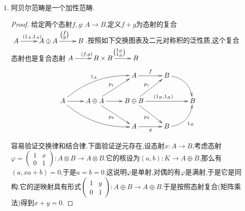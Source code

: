 \begin{enumerate}
\begin{proof}
    	这里证明后半段命题,前半段是对偶的.如果$\varphi:A\to B$是某个态射$Z\to A$的余核,那么记$\varphi$的核是$l:K\to A$,那么既然$Z\to A\to B$是0态射,按照核的定义得到了唯一的态射$Z\to K$.现在为了证明$\varphi$是$K\to A$的余核,任意给出一个$A\to C$使得$K\to A\to C$是零态射,那么复合态射$Z\to A\to C$同样是零态射,这样按照$A\to B$是$Z\to A$的余核得到唯一的$B\to C$.这就完成证明.
    	$$\xymatrix{&C&\\Z\ar[dr]_{\exists !}\ar[r]&A\ar[u]\ar[r]^{\varphi}&B\ar[ul]_{\exists !}\\&K\ar[u]^{l}&}$$
    \end{proof}
    \item 阿贝尔范畴是一个加性范畴.
    \begin{proof}
    	
    	给定两个态射$f,g:A\to B$,定义$f+g$为态射的复合$\xymatrix{A\ar[r]^{(1_A,1_A)}&A\oplus A\ar[r]^{\left(\substack{f\\g}\right)}&B}$.按照如下交换图表及二元对称积的泛性质,这个复合态射也是复合态射$\xymatrix{A\ar[r]^{(f,g)}&B\times B\ar[r]^{\left(\substack{1_B\\1_B}\right)}&B}$
    	$$\xymatrix{&&A\ar[r]^f&B\ar@/^1pc/[dr]&\\A\ar[r]\ar@/^1pc/[urr]^{1_A}\ar@/_1pc/[drr]&A\oplus A\ar[r]\ar[ur]^{p_1}\ar[dr]_{p_2}&B\oplus B\ar[ur]^{p_1}\ar[dr]_{p_2}\ar[rr]^{(1_B,1_B)}&&B\\&&A\ar[r]_g&B\ar@/_1pc/[ur]_{1_B}&}$$
    	
    	容易验证交换律和结合律.下面验证逆元存在,设态射$x:A\to B$,考虑态射$\varphi=\left(\begin{array}{cc}1&x\\0&1\end{array}\right):A\otimes B\to A\otimes B$.它的核设为$(a,b):K\to A\oplus B$,那么有$(a,xa+b)=0$,于是$a=b=0$.这说明$\varphi$是单射,对偶的有$\varphi$是满射,于是它是同构.它的逆映射具有形式$\left(\begin{array}{cc}1&y\\0&1\end{array}\right):A\oplus B\to A\oplus B$.于是按照态射复合(矩阵乘法)得到$x+y=0$.
    \end{proof}
\end{enumerate}

